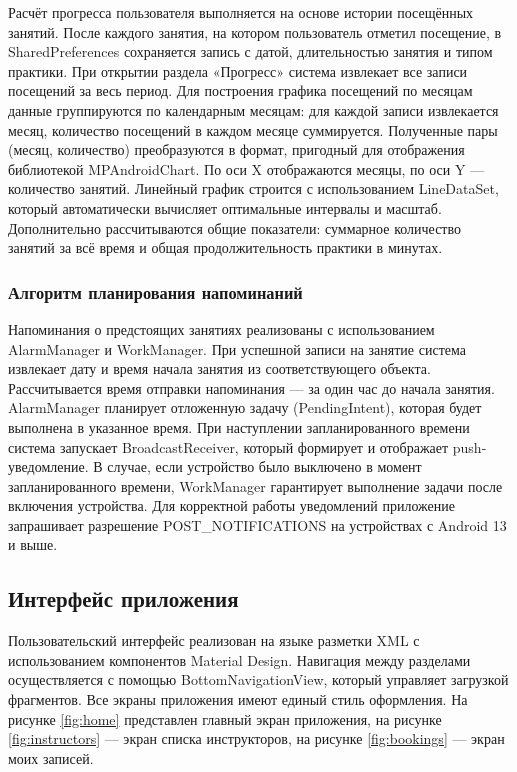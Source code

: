 Расчёт прогресса пользователя выполняется на основе истории посещённых занятий. После каждого занятия, на котором пользователь отметил посещение, в SharedPreferences сохраняется запись с датой, длительностью занятия и типом практики. При открытии раздела «Прогресс» система извлекает все записи посещений за весь период. Для построения графика посещений по месяцам данные группируются по календарным месяцам: для каждой записи извлекается месяц, количество посещений в каждом месяце суммируется. Полученные пары (месяц, количество) преобразуются в формат, пригодный для отображения библиотекой MPAndroidChart. По оси X отображаются месяцы, по оси Y — количество занятий. Линейный график строится с использованием LineDataSet, который автоматически вычисляет оптимальные интервалы и масштаб. Дополнительно рассчитываются общие показатели: суммарное количество занятий за всё время и общая продолжительность практики в минутах.

\subsubsection{Алгоритм планирования напоминаний}

Напоминания о предстоящих занятиях реализованы с использованием AlarmManager и WorkManager. При успешной записи на занятие система извлекает дату и время начала занятия из соответствующего объекта. Рассчитывается время отправки напоминания — за один час до начала занятия. AlarmManager планирует отложенную задачу (PendingIntent), которая будет выполнена в указанное время. При наступлении запланированного времени система запускает BroadcastReceiver, который формирует и отображает push-уведомление. В случае, если устройство было выключено в момент запланированного времени, WorkManager гарантирует выполнение задачи после включения устройства. Для корректной работы уведомлений приложение запрашивает разрешение POST\_NOTIFICATIONS на устройствах с Android 13 и выше.

\subsection{Интерфейс приложения}

Пользовательский интерфейс реализован на языке разметки XML с использованием компонентов Material Design. Навигация между разделами осуществляется с помощью BottomNavigationView, который управляет загрузкой фрагментов. Все экраны приложения имеют единый стиль оформления. На рисунке \ref{fig:home} представлен главный экран приложения, на рисунке \ref{fig:instructors} — экран списка инструкторов, на рисунке \ref{fig:bookings} — экран моих записей.

